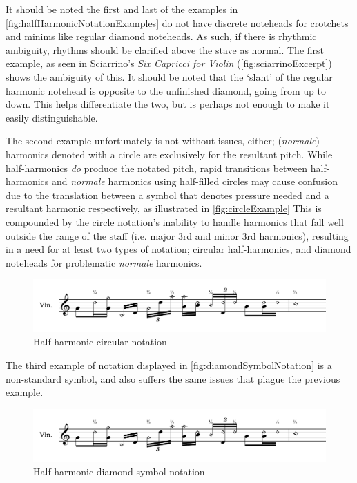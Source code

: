 It should be noted the first and last of the examples in \autoref{fig:halfHarmonicNotationExamples} do not have discrete noteheads for crotchets and minims like regular diamond noteheads.
As such, if there is rhythmic ambiguity, rhythms should be clarified above the stave as normal.
The first example, as seen in Sciarrino's \emph{Six Capricci for Violin} (\autoref{fig:sciarrinoExcerpt}) shows the ambiguity of this.
It should be noted that the `slant' of the regular harmonic notehead is opposite to the unfinished diamond, going from up to down.
This helps differentiate the two, but is perhaps not enough to make it easily distinguishable.

The second example unfortunately is not without issues, either; (\emph{normale}) harmonics denoted with a circle are exclusively for the resultant pitch.\autocite[419]{gouldBars2011} 
While half-harmonics \emph{do} produce the notated pitch, rapid transitions between half-harmonics and \emph{normale} harmonics using half-filled circles may cause confusion due to the translation between a symbol that denotes pressure needed and a resultant harmonic respectively, as illustrated in \autoref{fig:circleExample}
This is compounded by the circle notation's inability to handle harmonics that fall well outside the range of the staff (i.e. major 3rd and minor 3rd harmonics), resulting in a need for at least two types of notation; circular half-harmonics, and diamond noteheads for problematic \emph{normale} harmonics.

\begin{figure}
    \includegraphics[page=3,width=\textwidth]{resources/halfharmonicsExampleNotation.pdf}
    \caption{Half-harmonic circular notation} \label{fig:circleExample}
  \end{figure}

The third example of notation displayed in \autoref{fig:diamondSymbolNotation} is a non-standard symbol, and also suffers the same issues that plague the previous example.

\begin{figure}
  \includegraphics[page=4,width=\textwidth]{resources/halfharmonicsExampleNotation.pdf}
  \caption{Half-harmonic diamond symbol notation} \label{fig:diamondSymbolNotation}
\end{figure}

